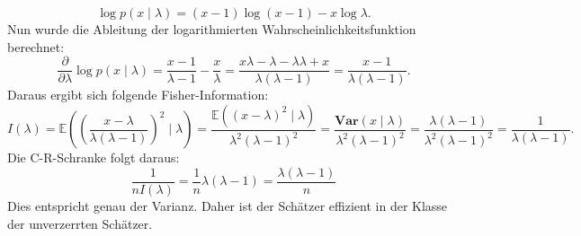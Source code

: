 \documentclass[10pt]{article}
\newcommand{\EW}{\mathbb{E}} %
\newcommand{\Var}{\textbf{Var}} %
\newenvironment{BSP}[1][]
{\begin{Beispiel}[frametitle=#1]}{\end{Beispiel}}
\begin{document}
\begin{BSP}[Beispiel 1.4.3 (Anwendung C-R-Schranke Geometrische Verteilung)]
		\begin{equation*}
			\log p (x \mid \lambda) = (x-1)\log (x-1) - x \log \lambda.
		\end{equation*}
		Nun wurde die Ableitung der logarithmierten Wahrscheinlichkeitsfunktion berechnet:
		\begin{equation*}
			\frac{\partial}{\partial\lambda} \log p(x \mid \lambda) = \frac{x-1}{\lambda -1} - \frac{x}{\lambda} = \frac{x \lambda - \lambda - \lambda \lambda + x}{\lambda (\lambda -1)} = \frac{x -1}{\lambda (\lambda -1)}.
		\end{equation*}
		Daraus ergibt sich folgende Fisher-Information:
		\begin{equation*}
			I(\lambda) = \EW\left(\left(\frac{x - \lambda}{\lambda ( \lambda -1)}\right)^2 \mid \lambda \right) = \frac{\EW ((x - \lambda)^2 \mid \lambda)}{\lambda^2(\lambda-1)^2} = \frac{\Var(x \mid \lambda)}{\lambda^2 (\lambda -1)^2} = \frac{\lambda (\lambda -1)}{\lambda^2 (\lambda -1)^2} = \frac{1}{\lambda (\lambda -1)}.
		\end{equation*}
		Die C-R-Schranke folgt daraus:
		\begin{equation*}
			\frac{1}{nI(\lambda)} = \frac{1}{n} \lambda ( \lambda - 1 ) = \frac{\lambda (\lambda -1)}{n}
		\end{equation*}
		Dies entspricht genau der Varianz. Daher ist der Schätzer effizient in der Klasse der unverzerrten Schätzer. 
	\end{BSP}
\end{document}
